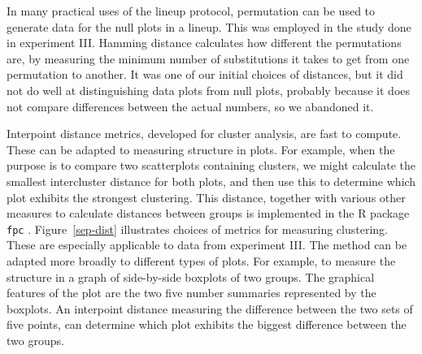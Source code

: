 \documentclass[12pt]{article}\usepackage[]{graphicx}\usepackage[]{color}
\begin{document}
In many practical uses of the lineup protocol, permutation can be used to generate data for the null plots in a lineup. This was employed in the study done in experiment III. Hamming distance \citep{hamming:1950} calculates how different the permutations are, by measuring the minimum number of substitutions it takes to get from one permutation to another. It was one of our initial choices of distances, but it did not do well at distinguishing data plots from null plots, probably because it does not compare differences between the actual numbers, so we abandoned it. 

Interpoint distance metrics, developed for cluster analysis, are fast to compute. These can be adapted to measuring structure in plots. For example, when the purpose is to compare two scatterplots containing clusters, we might calculate the smallest intercluster distance for both plots, and then use this to determine which plot exhibits the strongest clustering. This distance, together with various other measures to calculate distances between groups is implemented in the R package {\tt fpc} \citep{hennig:2010}. Figure~\ref{sep-dist} illustrates choices of metrics for measuring clustering. These are especially applicable to data from experiment III. The method can be adapted more broadly to different types of plots. For example, to measure the structure in a graph of side-by-side boxplots of two groups. The graphical features of the plot are the two five number summaries represented by the boxplots. An interpoint distance measuring the difference between the two sets of five points, can determine which plot exhibits the biggest difference between the two groups.
\end{document}
